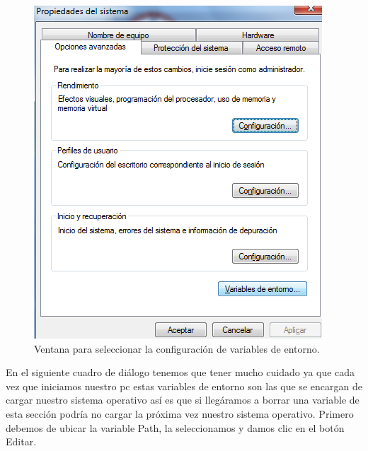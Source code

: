 \begin{figure}[H]
	\begin{center}
		\includegraphics[scale=.4]{images/instalaciones/java/img_java_11}
		\caption{Ventana para seleccionar la configuración de variables de entorno.}
	\end{center}
\end{figure}

En el siguiente cuadro de diálogo tenemos que tener mucho cuidado ya que cada
vez que iniciamos nuestro pc estas variables de entorno son las que se encargan
de cargar nuestro sistema operativo así es que si llegáramos a borrar una
variable de esta sección podría no cargar la próxima vez nuestro sistema
operativo. Primero debemos de ubicar la variable Path, la seleccionamos y damos
clic en el botón Editar.

